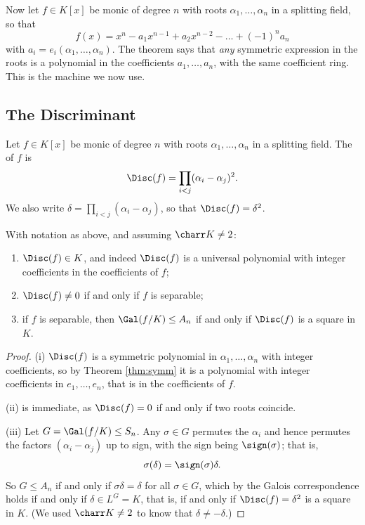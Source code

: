 Now let $f \in K[x]$ be monic of degree $n$ with roots $\alpha_1, \dots, \alpha_n$ in a splitting field, so that
$$f(x) = x^n - a_1x^{n-1} + a_2x^{n-2} - \dots + (-1)^n a_n$$
with $a_i = e_i(\alpha_1,\dots,\alpha_n)$. The theorem says that \emph{any} symmetric expression in the roots is a polynomial in the coefficients $a_1,\dots,a_n$, with the same coefficient ring. This is the machine we now use.

\subsection{The Discriminant}

\begin{definition}[Discriminant]
	Let $f \in K[x]$ be monic of degree $n$ with roots $\alpha_1,\dots,\alpha_n$ in a splitting field. The  of $f$ is
	$$\Disc(f) = \prod_{i<j}(\alpha_i - \alpha_j)^2.$$
	We also write $\delta = \prod_{i<j}(\alpha_i - \alpha_j)$, so that $\Disc(f) = \delta^2$.
\end{definition}

\begin{proposition}\label{prop:disc}
	With notation as above, and assuming $\charr K \neq 2$:
	\begin{enumerate}[label=(\roman*)]
		\item $\Disc(f) \in K$, and indeed $\Disc(f)$ is a universal polynomial with integer coefficients in the coefficients of $f$;
		\item $\Disc(f) \neq 0$ if and only if $f$ is separable;
		\item if $f$ is separable, then $\Gal(f/K) \leq A_n$ if and only if $\Disc(f)$ is a square in $K$.
	\end{enumerate}
\end{proposition}

\begin{proof}
	(i) $\Disc(f)$ is a symmetric polynomial in $\alpha_1, \dots, \alpha_n$ with integer coefficients, so by Theorem \ref{thm:symm} it is a polynomial with integer coefficients in $e_1, \dots, e_n$, that is in the coefficients of $f$.

	(ii) is immediate, as $\Disc(f) = 0$ if and only if two roots coincide.

	(iii) Let $G = \Gal(f/K) \leq S_n$. Any $\sigma \in G$ permutes the $\alpha_i$ and hence permutes the factors $(\alpha_i - \alpha_j)$ up to sign, with the sign being $\sign(\sigma)$; that is,
	$$\sigma(\delta) = \sign(\sigma)\delta.$$
	So $G \leq A_n$ if and only if $\sigma\delta = \delta$ for all $\sigma \in G$, which by the Galois correspondence holds if and only if $\delta \in L^G = K$, that is, if and only if $\Disc(f) = \delta^2$ is a square in $K$. (We used $\charr K \neq 2$ to know that $\delta \neq -\delta$.)
\end{proof}

